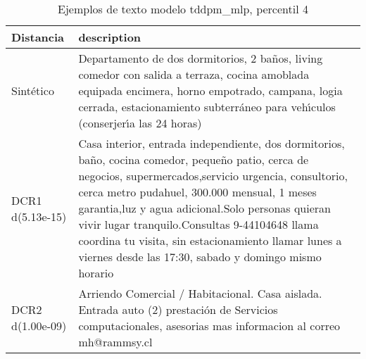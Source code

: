 \begin{table}[H]
\centering
\fontsize{10}{14}\selectfont
\caption{Ejemplos de texto modelo tddpm\_mlp, percentil 4}
\label{table-example-economicos-b-1-tddpm_mlp-4p-text}
\begin{tabular}{|l|m{35em}|}
\hline
\rowcolor[gray]{0.8}
Distancia & description \\
\hline Sintético & Departamento de dos dormitorios, 2 ba\~nos, living comedor con salida a terraza, cocina amoblada equipada encimera, horno empotrado, campana, logia cerrada, estacionamiento subterr\'aneo para veh{\'\i}culos (conserjer{\'\i}a las 24 horas) \\
\hline DCR1 d(5.13e-15) & Casa interior, entrada independiente, dos dormitorios, ba\~no, cocina comedor, peque\~no patio, cerca de negocios, supermercados,servicio urgencia, consultorio, cerca metro pudahuel, 300.000 mensual, 1 meses garantia,luz y agua adicional.Solo personas quieran vivir lugar tranquilo.Consultas 9-44104648
llama coordina tu visita, sin estacionamiento
llamar lunes a viernes desde las 17:30, sabado y domingo mismo horario \\
\hline DCR2 d(1.00e-09) & Arriendo Comercial / Habitacional. Casa aislada. Entrada auto (2) prestaci\'on de Servicios computacionales, asesorias  mas informacion al correo mh@rammsy.cl \\
\hline
\end{tabular}
\end{table}
